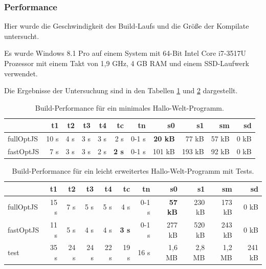\documentclass[a4paper, 12pt, hidelinks, listof=totoc, listoftables=totoc, bibliography=totoc]{scrreprt}
\begin{document}
\subsubsection{Performance}

Hier wurde die Geschwindigkeit des Build-Laufs und die Größe der Kompilate untersucht.

Es wurde Windows 8.1 Pro auf einem System mit 64-Bit Intel Core i7-3517U Prozessor mit einem Takt von 1,9 GHz, 4 GB RAM und einem SSD-Laufwerk verwendet.

Die Ergebnisse der Untersuchung sind in den Tabellen \ref{table:compiler-performance1} und \ref{table:compiler-performance2} dargestellt.

\medskip

\begin{table}[!h]
\begin{tabular}{|l|r|r|r|r|r|r||r|r|r|r|}
\hline           & t1   & t2   & t3   & t4   & tc            & tn    & s0             & s1     & sm    & sd    \\ 
\hline fullOptJS & 10 s &  4 s &  3 s &  3 s &          2 s  & 0-1 s & \textbf{20 kB} &  77 kB & 57 kB &  0 kB \\ 
\hline fastOptJS &  7 s &  3 s &  3 s &  2 s &  \textbf{2 s} & 0-1 s &        101 kB  & 193 kB & 92 kB &  0 kB \\ 
\hline 
\end{tabular} 
\caption{Build-Performance für ein minimales Hallo-Welt-Programm.}
\label{table:compiler-performance1}
\end{table}

\medskip

\begin{table}[!h]
\begin{tabular}{|l|r|r|r|r|r|r||r|r|r|r|}
\hline           & t1   & t2   & t3   & t4   & tc            & tn    & s0             & s1     & sm     & sd     \\ 
\hline fullOptJS & 15 s &  7 s &  5 s &  5 s &          4 s  & 0-1 s & \textbf{57 kB} & 230 kB & 173 kB &   0 kB \\ 
\hline fastOptJS & 11 s &  5 s &  4 s &  4 s &  \textbf{3 s} & 0-1 s &        277 kB  & 520 kB & 243 kB &   0 kB \\ 
\hline test      & 35 s & 24 s & 24 s & 22 s &         19 s  &  16 s &        1,6 MB  & 2,8 MB & 1,2 MB & 241 kB \\ 
\hline 
\end{tabular} 
\caption{Build-Performance für ein leicht erweitertes Hallo-Welt-Programm mit Tests.}
\label{table:compiler-performance2}
\end{table}
\end{document}
